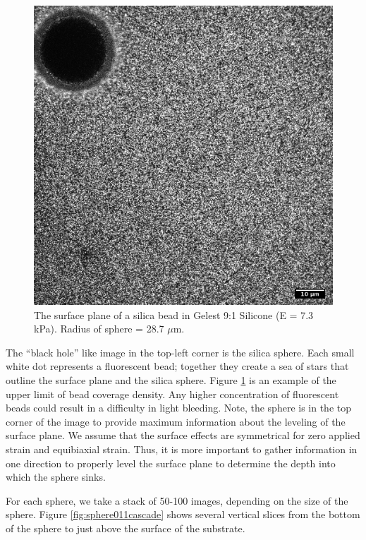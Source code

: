 \begin{figure}[h!]
	\centering
	\includegraphics[width=.75\linewidth]{Chapters/Figures/190215_g91_glass_sphere011_surface.png}
	\caption[The surface plane of a silica bead in silcone]{The surface plane of a silica bead in Gelest 9:1 Silicone (E = 7.3 kPa). Radius of sphere = 28.7 $\mu$m.}
	\label{fig:190215g91glasssphere011surface}
\end{figure}
The ``black hole'' like image in the top-left corner is the silica sphere. Each small white dot represents a fluorescent bead; together they create a sea of stars that outline the surface plane and the silica sphere. Figure \ref{fig:190215g91glasssphere011surface} is an example of the upper limit of bead coverage density. Any higher concentration of fluorescent beads could result in a difficulty in light bleeding. Note, the sphere is in the top corner of the image to provide maximum information about the leveling of the surface plane. We assume that the surface effects are symmetrical for zero applied strain and equibiaxial strain. Thus, it is more important to gather information in one direction to properly level the surface plane to determine the depth into which the sphere sinks. 

For each sphere, we take a stack of 50-100 images, depending on the size of the sphere. Figure \ref{fig:sphere011cascade} shows several vertical slices from the bottom of the sphere to just above the surface of the substrate.

